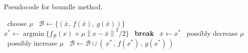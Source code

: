 \documentclass[a4paper]{article}
\DeclareMathOperator*{\argmin}{argmin}
\newcommand{\sqrnorm}[1]{{\left\lVert#1\right\rVert}^2}
\begin{document}
\begin{algorithm}
\caption{Pseudocode for boundle method.}
\begin{algorithmic}
        \State~choose $\mu$
        \State~$\mathscr{B} \gets \{(\bar{x},~f(\bar{x}),~g(\bar{x}))\}$
            \State~$x^* \gets \argmin{\{f_{\mathscr{B}}(x) + \mu \sqrnorm{x - \bar{x}} / 2 \}}$
                \State~\textbf{break}
            \EndIf
                \State~$\bar{x} \gets x^*$
                \State~possibly decrease $\mu$
            \Else
                \State~possibly increase $\mu$
            \EndIf
            \State~$\mathscr{B} \gets \mathscr{B} \cup ( \, x^* \,,\, f(x^*) \,,\, g(x^*) \, )$
        \EndWhile
    \EndProcedure
\end{algorithmic}
\end{algorithm}
\end{document}
